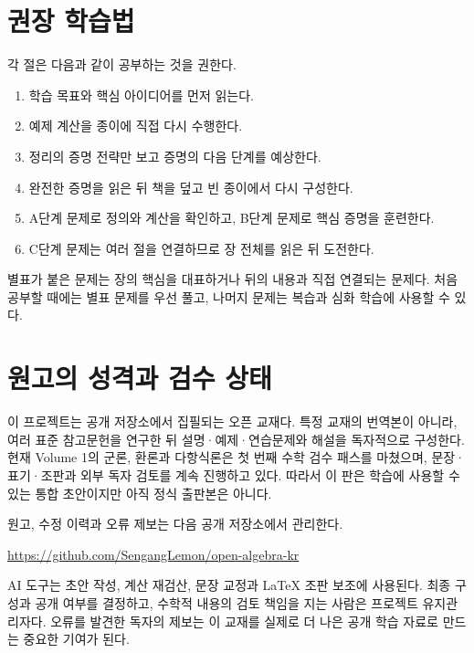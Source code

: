 \section*{권장 학습법}

각 절은 다음과 같이 공부하는 것을 권한다.

\begin{enumerate}
  \item 학습 목표와 핵심 아이디어를 먼저 읽는다.
  \item 예제 계산을 종이에 직접 다시 수행한다.
  \item 정리의 증명 전략만 보고 증명의 다음 단계를 예상한다.
  \item 완전한 증명을 읽은 뒤 책을 덮고 빈 종이에서 다시 구성한다.
  \item A단계 문제로 정의와 계산을 확인하고, B단계 문제로 핵심 증명을 훈련한다.
  \item C단계 문제는 여러 절을 연결하므로 장 전체를 읽은 뒤 도전한다.
\end{enumerate}

별표가 붙은 문제는 장의 핵심을 대표하거나 뒤의 내용과 직접 연결되는 문제다. 처음 공부할 때에는 별표 문제를 우선 풀고, 나머지 문제는 복습과 심화 학습에 사용할 수 있다.

\section*{원고의 성격과 검수 상태}

이 프로젝트는 공개 저장소에서 집필되는 오픈 교재다. 특정 교재의 번역본이 아니라, 여러 표준 참고문헌을 연구한 뒤 설명·예제·연습문제와 해설을 독자적으로 구성한다. 현재 Volume 1의 군론, 환론과 다항식론은 첫 번째 수학 검수 패스를 마쳤으며, 문장·표기·조판과 외부 독자 검토를 계속 진행하고 있다. 따라서 이 판은 학습에 사용할 수 있는 통합 초안이지만 아직 정식 출판본은 아니다.

원고, 수정 이력과 오류 제보는 다음 공개 저장소에서 관리한다.

\begin{center}
\url{https://github.com/SengangLemon/open-algebra-kr}
\end{center}

AI 도구는 초안 작성, 계산 재검산, 문장 교정과 LaTeX 조판 보조에 사용된다. 최종 구성과 공개 여부를 결정하고, 수학적 내용의 검토 책임을 지는 사람은 프로젝트 유지관리자다. 오류를 발견한 독자의 제보는 이 교재를 실제로 더 나은 공개 학습 자료로 만드는 중요한 기여가 된다.

